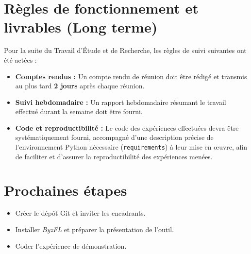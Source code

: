 \documentclass[11pt, a4paper]{article}
\begin{document}
\section{Règles de fonctionnement et livrables (Long terme)}
Pour la suite du Travail d'Étude et de Recherche, les règles de suivi suivantes ont été actées :
\begin{itemize}
    \item \textbf{Comptes rendus :} Un compte rendu de réunion doit être rédigé et transmis au plus tard \textbf{2 jours} après chaque réunion.
    \item \textbf{Suivi hebdomadaire :} Un rapport hebdomadaire résumant le travail effectué durant la semaine doit être fourni.
    \item \textbf{Code et reproductibilité :} Le code des expériences effectuées devra être systématiquement fourni, accompagné d'une description précise de l'environnement Python nécessaire (\texttt{requirements}) à leur mise en œuvre, afin de faciliter et d'assurer la reproductibilité des expériences menées.
\end{itemize} 

\section{Prochaines étapes}
\begin{itemize}[label=$\square$]
    \item Créer le dépôt Git et inviter les encadrants.
    \item Installer \textit{ByzFL} et préparer la présentation de l'outil.
    \item Coder l'expérience de démonstration.
\end{itemize}
\end{document}
